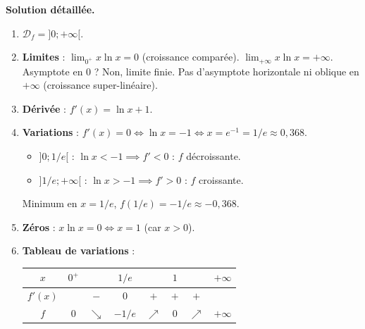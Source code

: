 \documentclass[11pt]{article}
\begin{document}
\begin{exoresolu}
\medskip
\noindent\textbf{Solution détaillée.}
\begin{enumerate}
    \item $\mathcal{D}_f = ]0;+\infty[$.
    \item \textbf{Limites} :
          $\lim_{0^+} x\ln x = 0$ (croissance comparée). $\lim_{+\infty} x\ln x = +\infty$.
          Asymptote en $0$ ? Non, limite finie. Pas d'asymptote horizontale ni oblique en $+\infty$ (croissance super-linéaire).
    \item \textbf{Dérivée} : $f'(x) = \ln x + 1$.
    \item \textbf{Variations} : $f'(x)=0 \iff \ln x = -1 \iff x = e^{-1} = 1/e \approx 0,368$.
          \begin{itemize}
              \item $]0; 1/e[$ : $\ln x < -1 \implies f'<0$ : $f$ décroissante.
              \item $]1/e; +\infty[$ : $\ln x > -1 \implies f'>0$ : $f$ croissante.
          \end{itemize}
          Minimum en $x=1/e$, $f(1/e) = -1/e \approx -0,368$.
    \item \textbf{Zéros} : $x\ln x = 0 \iff x=1$ (car $x>0$).
    \item \textbf{Tableau de variations} :
\begin{center}
\begin{tabular}{|c|ccccccc|}\hline
$x$ & $0^+$ & & $1/e$ & & $1$ & & $+\infty$ \\ \hline
$f'(x)$ & & $-$ & $0$ & $+$ & $+$ & $+$ & \\ \hline
$f$ & $0$ & $\searrow$ & $-1/e$ & $\nearrow$ & $0$ & $\nearrow$ & $+\infty$ \\ \hline
\end{tabular}
\end{center}
\end{enumerate}
\end{exoresolu}
\end{document}
